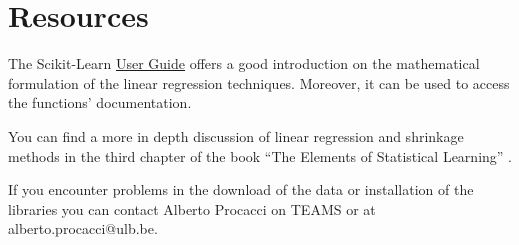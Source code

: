 \documentclass[11pt]{article}
\begin{document}
\section*{Resources}
The Scikit-Learn \href{https://scikit-learn.org/stable/modules/linear_model.html#ridge-regression}{User Guide} offers a good introduction on the mathematical formulation of the linear regression techniques. Moreover, it can be used to access the functions' documentation. \par
You can find a more in depth discussion of linear regression and shrinkage methods in the third chapter of the book ``The Elements of Statistical Learning'' \cite{Hastie2009}. \par
If you encounter problems in the download of the data or installation of the libraries you can contact Alberto Procacci on TEAMS or at alberto.procacci@ulb.be.



\end{document}
